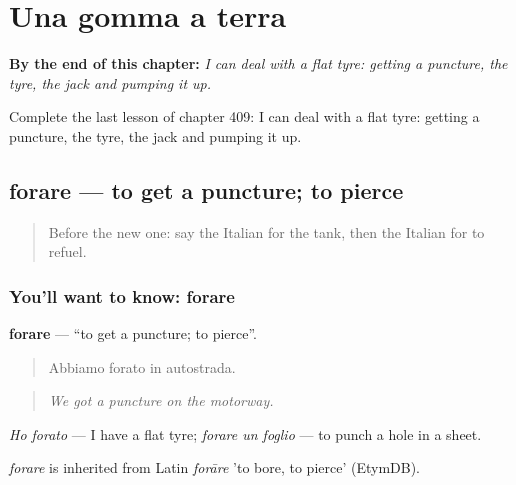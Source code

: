
\chapter{Una gomma a terra}
\label{ch:it-una-gomma-a-terra}

\begin{chapteropening}
\textbf{By the end of this chapter:} \emph{I can deal with a flat tyre: getting a puncture, the tyre, the jack and pumping it up.}

Complete the last lesson of chapter 409: I can deal with a flat tyre: getting a puncture, the tyre, the jack and pumping it up.
\end{chapteropening}

\section[forare]{forare — to get a puncture; to pierce}

\label{lesson:IT-C409-forare}



\begin{quote}
Before the new one: say the Italian for the tank, then the Italian for to refuel.
\end{quote}

\subsection*{You'll want to know: forare}
\textbf{forare} — \textquotedblleft{}to get a puncture; to pierce\textquotedblright{}.

\begin{quote}
Abbiamo forato in autostrada.
\end{quote}

\begin{quote}
\emph{We got a puncture on the motorway.}
\end{quote}

\emph{Ho forato} — I have a flat tyre; \emph{forare un foglio} — to punch a hole in a sheet.

\begin{cousinweb}
\emph{forare} is inherited from Latin \emph{forāre} 'to bore, to pierce' (EtymDB).
\end{cousinweb}

